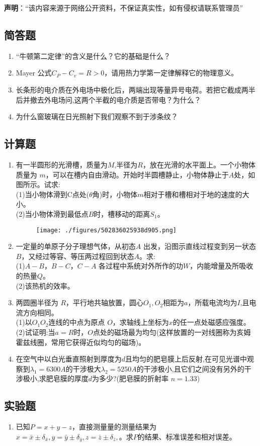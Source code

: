 

\textbf{声明}：“该内容来源于网络公开资料，不保证真实性，如有侵权请联系管理员”
\subsection{简答题}
\begin{enumerate}
\item “牛顿第二定律”的含义是什么？它的基础是什么？
\item  Mayer 公式$C_P-C_v=R>0$，请用热力学第一定律解释它的物理意义。
\item 长条形的电介质在外电场中极化后，两端出现等量异号电荷。若把它截成两半后并撤去外电场问,这两个半截的电介质是否带电？为什么？
\item 为什么窗玻璃在日光照射下我们观察不到于涉条纹？
\end{enumerate}
\subsection{计算题}
\begin{enumerate}
\item 有一半圆形的光滑槽，质量为$ M$,半径为$R$，放在光滑的水平面上。一个小物体质量为 $m$，可以在槽内自由滑动。开始时半圆槽静止，小物体静止于$A$处，如图所示。试求:\\
(1)当小物体滑到C点处($\theta$角)时，小物体$m$相对于槽和槽相对于地的速度的大小。\\
(2)当小物体滑到最低点$B$时，槽移动的距离$S_1$。
\begin{figure}[ht]
\centering
\texttt{[image: ./figures/502836025938d905.png]}
\caption{} \label{fig_SY19_1}
\end{figure}
\item 一定量的单原子分子理想气体，从初态$A$ 出发，沿图示直线过程变到另一状态$B$，又经过等容、等压两过程回到状态$ A$。求:\\
(1)$A-B$，$B-C$，$C-A$ 各过程中系统对外所作的功$W $，内能增量及所吸收的热量$Q$。\\
(2)该热机的效率。
\item 两圆圈半径为 $R$，平行地共轴放置，圆心$O_1,O_2$相距为$a$，所载电流均为$I$,且电流方向相同。\\
(1)以$O_1O_2$连线的中点为原点 $O$，求轴线上坐标为$x$的任一点处磁感应强度。\\(2)试证明:当$a=R$时，$O$点处的磁场最为均匀(这样放置的一对线圈称为亥姆霍兹线圈，常用它获得近似均匀的磁场)。
\item 在空气中以白光垂直照射到厚度为$d$且均匀的肥皂膜上后反射,在可见光谱中观察到$\lambda_1=6300A$的干涉极大$\lambda_2=5250A$的干涉极小,且它们之间没有另外的干涉极小,求肥皂膜的厚度$d$为多少?(肥皂膜的折射率 $n=1.33$)
\end{enumerate}
\subsection{实验题}
\begin{enumerate}
\item 已知$P=x+y-z$，直接测量量的测量结果为$x=\bar x \pm \delta_{\bar x},y=\bar y \pm \delta_{\bar y},z=\bar z \pm \delta_{\bar z},$。求$P$的结果、标准误差和相对误差。
\end{enumerate}